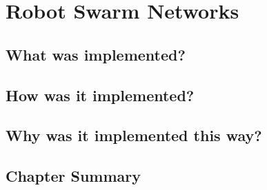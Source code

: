 \chapter{Robot Swarm Networks}
\label{chapter5}


\section{What was implemented?}

\section{How was it implemented?}

\section{Why was it implemented this way?}

\section {Chapter Summary}

